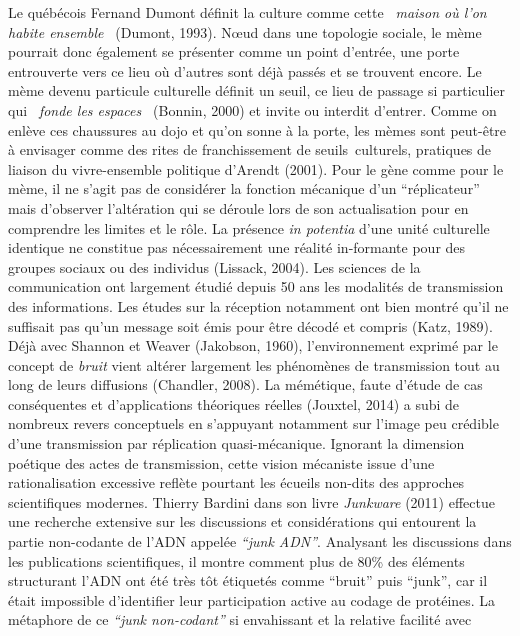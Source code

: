Le qu\'eb\'ecois Fernand Dumont d\'efinit la culture comme cette \textit{{\guillemotleft}~maison o\`u l{\textquoteright}on habite ensemble~{\guillemotright} }(Dumont, 1993). N{\oe}ud dans une topologie sociale, le m\`eme pourrait donc \'egalement se pr\'esenter comme un point d{\textquoteright}entr\'ee, une porte entrouverte vers ce lieu o\`u d{\textquoteright}autres sont d\'ej\`a pass\'es et se trouvent encore. Le m\`eme devenu particule culturelle d\'efinit un seuil, ce lieu de passage si particulier qui \textit{{\guillemotleft}~fonde les espaces~{\guillemotright}} (Bonnin, 2000) et invite ou interdit d{\textquoteright}entrer. Comme on enl\`eve ces chaussures au dojo et qu{\textquoteright}on sonne \`a la porte, les m\`emes sont peut-\^etre \`a envisager comme des rites de franchissement de seuils~culturels, pratiques de liaison du vivre-ensemble politique d{\textquoteright}Arendt (2001). Pour le g\`ene comme pour le m\`eme, il ne s{\textquoteright}agit pas de consid\'erer la fonction m\'ecanique d{\textquoteright}un {\textquotedblleft}r\'eplicateur{\textquotedblright} mais d{\textquoteright}observer l{\textquoteright}alt\'eration qui se d\'eroule lors de son actualisation pour en comprendre les limites et le r\^ole. La pr\'esence \textit{in potentia }d{\textquoteright}une unit\'e culturelle identique ne constitue pas n\'ecessairement une r\'ealit\'e in-formante pour des groupes sociaux ou des individus (Lissack, 2004). Les sciences de la communication ont largement \'etudi\'e depuis 50 ans les modalit\'es de transmission des informations. Les \'etudes sur la r\'eception notamment ont bien montr\'e qu{\textquoteright}il ne suffisait pas qu{\textquoteright}un message soit \'emis pour \^etre d\'ecod\'e et compris (Katz, 1989). D\'ej\`a avec Shannon et Weaver (Jakobson, 1960), l{\textquoteright}environnement exprim\'e par le concept de\textit{ bruit }vient alt\'erer largement les ph\'enom\`enes de transmission tout au long de leurs diffusions (Chandler, 2008). La m\'em\'etique, faute d{\textquoteright}\'etude de cas cons\'equentes et d{\textquoteright}applications th\'eoriques r\'eelles (Jouxtel, 2014) a subi de nombreux revers conceptuels en s{\textquoteright}appuyant notamment sur l{\textquoteright}image peu cr\'edible d{\textquoteright}une transmission par r\'eplication quasi-m\'ecanique. Ignorant la dimension po\'etique des actes de transmission, cette vision m\'ecaniste issue d{\textquoteright}une rationalisation excessive refl\`ete pourtant les \'ecueils non-dits des approches scientifiques modernes. Thierry Bardini dans son livre \textit{Junkware }(2011) effectue une recherche extensive sur les discussions et consid\'erations qui entourent la partie non-codante de l{\textquoteright}ADN appel\'ee \textit{{\textquotedblleft}junk ADN{\textquotedblright}}. Analysant les discussions dans les publications scientifiques, il montre comment plus de 80\% des \'el\'ements structurant l{\textquoteright}ADN ont \'et\'e tr\`es t\^ot \'etiquet\'es comme {\textquotedblleft}bruit{\textquotedblright} puis {\textquotedblleft}junk{\textquotedblright}, car il \'etait impossible d{\textquoteright}identifier leur participation active au codage de prot\'eines. La m\'etaphore de ce \textit{{\textquotedblleft}junk non-codant{\textquotedblright} }si envahissant et la relative facilit\'e avec 